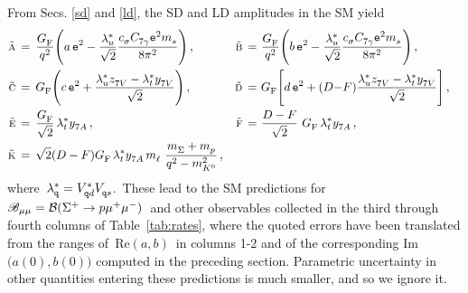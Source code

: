 \documentclass[amsmath,amssymb,aps,nofootinbib,prd,preprint,superscriptaddress,tightenlines,a4paper,bm]{revtex4-2}
\begin{document}
From Secs.\,\,\ref{sd} and \ref{ld}, the SD and LD amplitudes in the SM yield
%
\begin{align} \label{abcdefk}
\tilde{\textsc a} & \,=\, \frac{G_{\rm F}^{}}{q^2} \Bigg( a\, {\tt e}^2 - \frac{\lambda_u^*}{\sqrt2} \frac{c_\sigma^{} C_{7\gamma}^{} {\tt e}^2 m_s^{}}{8\pi^2} \Bigg) \,, &
\tilde{\textsc b} \,= &~ \frac{G_{\rm F}^{}}{q^2} \Bigg( b\, {\tt e}^2 - \frac{\lambda_u^*}{\sqrt2} \frac{c_\sigma^{} C_{7\gamma}^{} {\tt e}^2 m_s^{}}{8\pi^2} \Bigg) \,,
\nonumber \\
\tilde{\textsc c} & \,=\, G_{\rm F}^{} \Bigg( c\, {\tt e}^2 + \frac{\lambda_u^*z_{7V}^{}-\lambda_t^*y_{7V}^{}}{\sqrt2} \Bigg) \,, &
\tilde{\textsc d} \,= &~ G_{\rm F}^{} \Bigg[ d\, {\tt e}^2 + (D{-}F) \frac{\lambda_u^*z_{7V}^{}-\lambda_t^*y_{7V}^{}}{\sqrt2} \Bigg] \,,
\nonumber \\
\tilde{\textsc e} & \,=\, \frac{G_{\rm F}^{}}{\sqrt2}\, \lambda_t^*y_{7A}^{} \,, &
\tilde{\textsc f} \,= &~ \frac{D-F}{\sqrt2}~ G_{\rm F}^{}\, \lambda_t^* y_{7A}^{} \,, &
\nonumber \\
\tilde{\textsc k} & \,=\, \sqrt2 (D-F) G_{\rm F}^{}\, \lambda_t^* y_{7A}^{}\, m_\ell^{}~ \frac{m_\Sigma^{}+m_p^{}}{q^2-m_{K^0}^2} \,,
\end{align}
where \,$\lambda_{\tt q}^* = V_{{\tt q}d}^* V_{{\tt q}s}^{}$.\,
These lead to the SM predictions for \,$\mathscr B_{\mu\mu}={\cal B}(\Sigma^+\to p\mu^+\mu^-)$\, and other observables collected in the third through fourth columns of Table~\ref{tab:rates}, where the quoted errors have been translated from the ranges of \,Re$(a,b)$\, in columns 1-2 and of the corresponding  Im$\big(a(0),b(0)\big)$  computed in the preceding section.
Parametric uncertainty in other quantities entering these predictions is much smaller, and so we ignore it.
\end{document}
